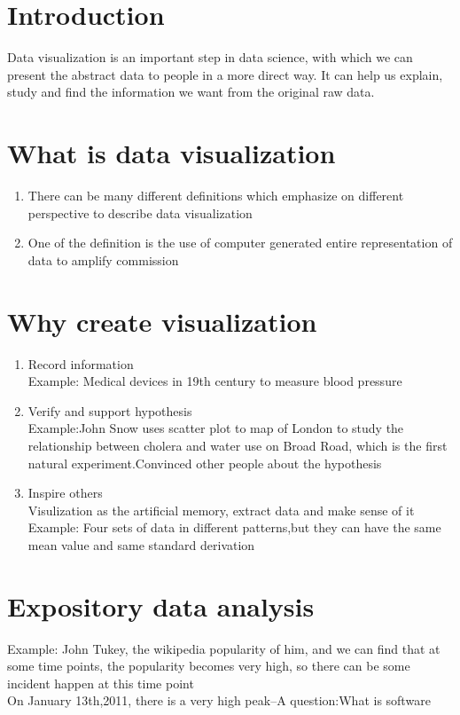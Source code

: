 
\section{Introduction}
     Data visualization is an important step in data science, with which we can present the abstract data to people in a more direct way. It can help us explain, study and find the information we want from the original raw data.
\section{What is data visualization}
\begin{enumerate}
\item There can be many different definitions which emphasize on different perspective to describe data visualization
\item One of the definition is the use of computer generated entire representation of data to amplify commission 
\end{enumerate}

\section{Why create visualization}
\begin{enumerate}
\item Record information\\
     Example: Medical devices in 19th century to measure blood pressure


\item Verify and support hypothesis\\
      Example:John Snow uses scatter plot to map of London to study the relationship between cholera and water use on Broad Road, which is the first natural experiment.Convinced other people about the hypothesis 
\item Inspire others\\Visulization as the artificial memory, extract data and make sense of it\\Example: Four sets of data in different patterns,but they can have the same mean value and same standard derivation 
\end{enumerate}
\section{Expository data analysis}
Example: John Tukey, the wikipedia popularity of him, and we can find that at some time points, the popularity becomes very high, so there can be some incident happen at this time point\\  On January 13th,2011, there is a very high peak--A question:What is software

